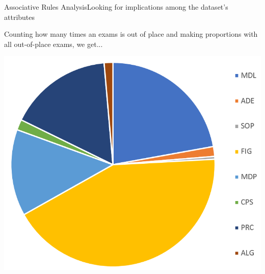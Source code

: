 \begin{frame}{Associative Rules Analysis}{Looking for implications among the dataset's attributes}

\vspace{0.1cm}
	Counting how many times an exams is out of place and making proportions with all out-of-place exams, we get...\\ \vspace{0.2cm}

    \begin{centering}
        \hspace*{2cm}\includegraphics[scale=0.25]{seq2.png}
    \end{centering}

\end{frame}